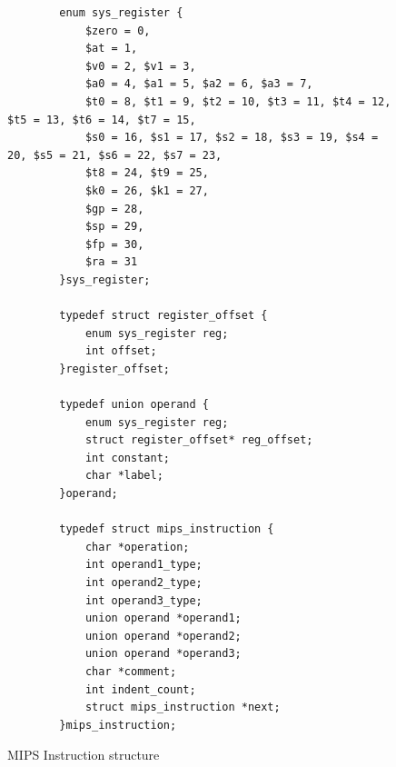 \begin{figure}[p]
	\begin{verbatim}
		enum sys_register {
		    $zero = 0, 
		    $at = 1,	
		    $v0 = 2, $v1 = 3,
		    $a0 = 4, $a1 = 5, $a2 = 6, $a3 = 7,
		    $t0 = 8, $t1 = 9, $t2 = 10, $t3 = 11, $t4 = 12, $t5 = 13, $t6 = 14,	$t7 = 15,					
		    $s0 = 16, $s1 = 17, $s2 = 18, $s3 = 19, $s4 = 20, $s5 = 21, $s6 = 22, $s7 = 23,
		    $t8 = 24, $t9 = 25,
		    $k0 = 26, $k1 = 27,
		    $gp = 28,
		    $sp = 29,
		    $fp = 30,
		    $ra = 31				
		}sys_register;

		typedef struct register_offset {
		    enum sys_register reg;
		    int offset;
		}register_offset;

		typedef union operand {
		    enum sys_register reg;
		    struct register_offset* reg_offset;
		    int constant;
		    char *label;
		}operand;
		
		typedef struct mips_instruction {
		    char *operation;
		    int operand1_type;
		    int operand2_type;
		    int operand3_type;
		    union operand *operand1;
		    union operand *operand2;
		    union operand *operand3;		
		    char *comment;
		    int indent_count;
		    struct mips_instruction *next;
		}mips_instruction;
	\end{verbatim}
	\caption{MIPS Instruction structure}
	\label{fig:mipsinstr}
\end{figure}